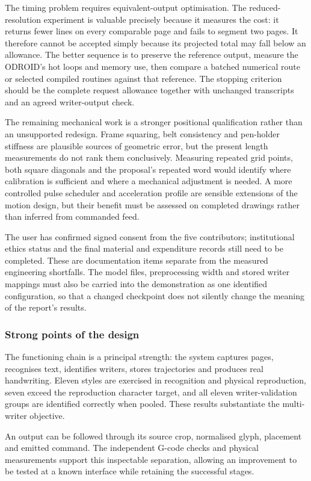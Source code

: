 The timing problem requires equivalent-output optimisation. The reduced-resolution experiment is valuable precisely because it measures the cost: it returns fewer lines on every comparable page and fails to segment two pages. It therefore cannot be accepted simply because its projected total may fall below an allowance. The better sequence is to preserve the reference output, measure the ODROID's hot loops and memory use, then compare a batched numerical route or selected compiled routines against that reference. The stopping criterion should be the complete request allowance together with unchanged transcripts and an agreed writer-output check.

The remaining mechanical work is a stronger positional qualification rather than an unsupported redesign. Frame squaring, belt consistency and pen-holder stiffness are plausible sources of geometric error, but the present length measurements do not rank them conclusively. Measuring repeated grid points, both square diagonals and the proposal's repeated word would identify where calibration is sufficient and where a mechanical adjustment is needed. A more controlled pulse scheduler and acceleration profile are sensible extensions of the motion design, but their benefit must be assessed on completed drawings rather than inferred from commanded feed.

The user has confirmed signed consent from the five contributors; institutional ethics status and the final material and expenditure records still need to be completed. These are documentation items separate from the measured engineering shortfalls. The model files, preprocessing width and stored writer mappings must also be carried into the demonstration as one identified configuration, so that a changed checkpoint does not silently change the meaning of the report's results.

\subsubsection{Strong points of the design}
\label{sec:dis-strengths}
The functioning chain is a principal strength: the system captures pages, recognises text, identifies writers, stores trajectories and produces real handwriting. Eleven styles are exercised in recognition and physical reproduction, seven exceed the reproduction character target, and all eleven writer-validation groups are identified correctly when pooled. These results substantiate the multi-writer objective.

An output can be followed through its source crop, normalised glyph, placement and emitted command. The independent G-code checks and physical measurements support this inspectable separation, allowing an improvement to be tested at a known interface while retaining the successful stages.

